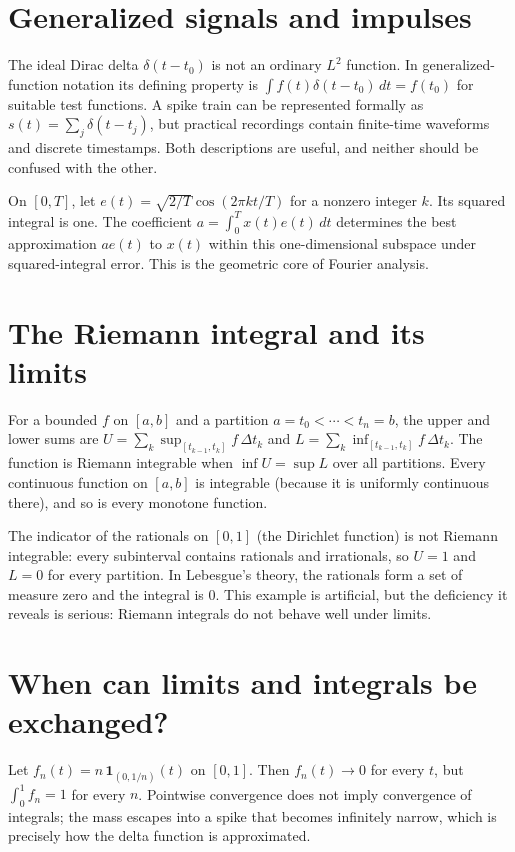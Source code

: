 \section{Generalized signals and impulses}
The ideal Dirac delta $\delta(t-t_0)$ is not an ordinary $L^2$ function. In generalized-function notation its defining property is $\int f(t)\delta(t-t_0)\,dt=f(t_0)$ for suitable test functions. A spike train can be represented formally as $s(t)=\sum_j\delta(t-t_j)$, but practical recordings contain finite-time waveforms and discrete timestamps. Both descriptions are useful, and neither should be confused with the other.

\begin{workedexample}
On $[0,T]$, let $e(t)=\sqrt{2/T}\cos(2\pi kt/T)$ for a nonzero integer $k$. Its squared integral is one. The coefficient $a=\int_0^T x(t)e(t)\,dt$ determines the best approximation $ae(t)$ to $x(t)$ within this one-dimensional subspace under squared-integral error. This is the geometric core of Fourier analysis.
\end{workedexample}
\section{The Riemann integral and its limits}
For a bounded $f$ on $[a,b]$ and a partition $a=t_0<\cdots<t_n=b$, the upper and lower sums are $U=\sum_k\sup_{[t_{k-1},t_k]}f\,\Delta t_k$ and $L=\sum_k\inf_{[t_{k-1},t_k]}f\,\Delta t_k$. The function is Riemann integrable when $\inf U=\sup L$ over all partitions. Every continuous function on $[a,b]$ is integrable (because it is uniformly continuous there), and so is every monotone function.

The indicator of the rationals on $[0,1]$ (the Dirichlet function) is not Riemann integrable: every subinterval contains rationals and irrationals, so $U=1$ and $L=0$ for every partition. In Lebesgue's theory, the rationals form a set of measure zero and the integral is $0$. This example is artificial, but the deficiency it reveals is serious: Riemann integrals do not behave well under limits.

\section{When can limits and integrals be exchanged?}
Let $f_n(t)=n\,\mathbf 1_{(0,1/n)}(t)$ on $[0,1]$. Then $f_n(t)\to0$ for every $t$, but $\int_0^1f_n=1$ for every $n$. Pointwise convergence does not imply convergence of integrals; the mass escapes into a spike that becomes infinitely narrow, which is precisely how the delta function is approximated.

